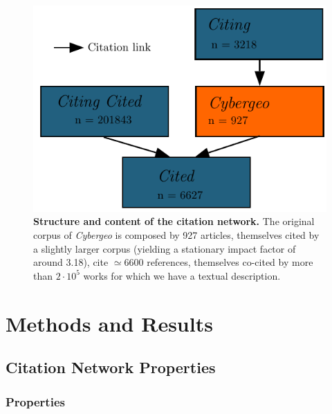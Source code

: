 


\begin{figure}
\centering
\includegraphics[width=\textwidth]{figures/Fig2.pdf}
\caption{\textbf{Structure and content of the citation network.} The original corpus of \emph{Cybergeo} is composed by 927 articles, themselves cited by a slightly larger corpus (yielding a stationary impact factor of around 3.18), cite $\simeq 6600$ references, themselves co-cited by more than $2\cdot 10^5$ works for which we have a textual description.}
\label{fig:citationnetwork}
\end{figure}









\section*{Methods and Results}
\label{sec:results}



\subsection*{Citation Network Properties}

\subsubsection*{Properties}

